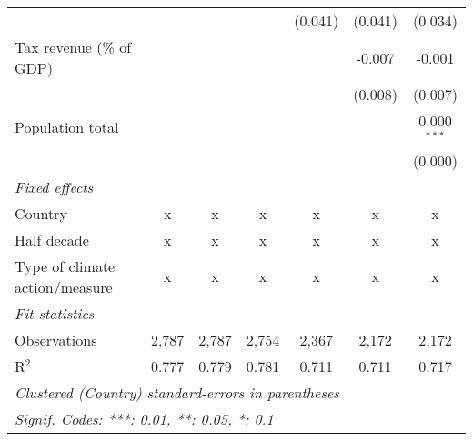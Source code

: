 \begin{tabular}{lcccccc}
                                            &                &                &                & (0.041)        & (0.041)        & (0.034)\\   
   Tax revenue (\% of GDP)                  &                &                &                &                & -0.007         & -0.001\\   
                                            &                &                &                &                & (0.008)        & (0.007)\\   
   Population total                         &                &                &                &                &                & 0.000$^{***}$\\   
                                            &                &                &                &                &                & (0.000)\\   
   \emph{Fixed effects}\\
   Country                                  & x              & x              & x              & x              & x              & x\\  
   Half decade                              & x              & x              & x              & x              & x              & x\\  
   Type of climate action/measure           & x              & x              & x              & x              & x              & x\\  
   \midrule \emph{Fit statistics}\\
   Observations                             & 2,787          & 2,787          & 2,754          & 2,367          & 2,172          & 2,172\\  
   R$^2$                                    & 0.777          & 0.779          & 0.781          & 0.711          & 0.711          & 0.717\\  
   \midrule
   \multicolumn{7}{l}{\emph{Clustered (Country) standard-errors in parentheses}}\\
   \multicolumn{7}{l}{\emph{Signif. Codes: ***: 0.01, **: 0.05, *: 0.1}}\\
\end{tabular}
\par\endgroup



